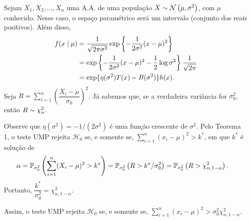 \begin{theorem}
Sejam $X_1,X_2,\ldots,X_n$ uma A.A. de uma população $X\sim\normdist{\mu,\sigma^2}$, com $\mu$ conhecido. Nesse caso, o espaço paramétrico será um intervalo (conjunto dos reais positivos). Além disso,
\begin{align}
f(x\mid\mu) &= \frac{1}{\sqrt{2\pi\sigma^2}}\exp\left\{-\frac{1}{2\sigma^2}(x-\mu)^2\right\}\notag\\
&= \exp\left\{-\frac{1}{2\sigma^2}(x-\mu)^2-\frac{1}{2}\log\sigma^2\right\}\frac{1}{\sqrt{2\pi}}\notag\\
&= \exp\{\eta(\sigma^2)T(x)-B(\sigma^2)\}h(x).
\end{align}
Seja $R=\sum_{i=1}^n\left(\dfrac{X_i-\mu}{\sigma_0}\right)^2$. Já sabemos que, se a verdadeira variância for $\sigma_0^2$, então $R\sim\chidist{n}$.

Observe que $\eta(\sigma^2)=-1/(2\sigma^2)$ é uma função crescente de $\sigma^2$. Pelo Teorema 1, o teste UMP rejeita $\mathcal{H}_0$ se, e somente se, $\sum_{i=1}^n(x_i-\mu)^2>k^*$, em que $k^*$ é solução de
\begin{align}
\alpha=\P_{\sigma_0^2}\left(\sum_{i=1}^n(X_i-\mu)^2>k^*\right) &= \P_{\sigma_0^2}\left(R>k^*/\sigma_0^2\right) = \P_{\sigma_0^2}\left(R>\chi^2_{n,1-\alpha}\right).
\end{align}
Portanto, $\dfrac{k^*}{\sigma_0^2}=\chi^2_{n,1-\alpha}$.

Assim, o teste UMP rejeita $\mathcal{H}_0$ se, e somente se, $\sum_{i=1}^n(x_i-\mu)^2>\sigma_0^2\chi^2_{n,1-\alpha}$.
\end{theorem}

